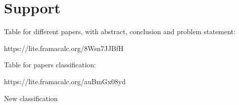 \documentclass[a4paper,10pt]{article}
\begin{document}


\section{Support}

Table for different papers, with abstract, conclusion and problem statement:

https://lite.framacalc.org/8Wsn7JJBfH

Table for papers classification:

https://lite.framacalc.org/auBmGx08yd

New classification
\end{document}
